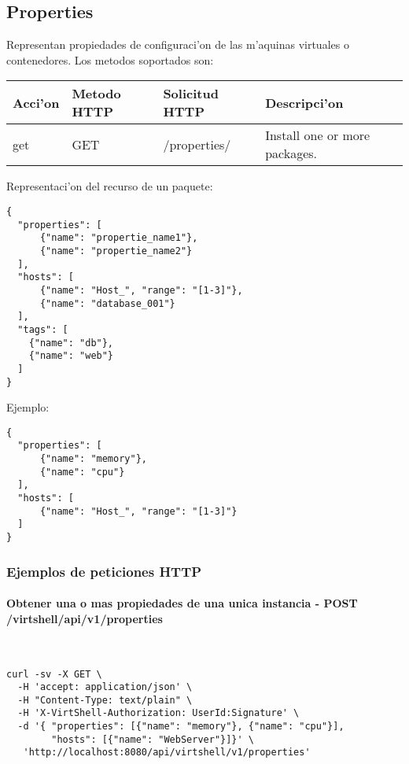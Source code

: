 \subsection{Properties}
Representan propiedades de configuraci'on de las m'aquinas virtuales o contenedores. Los metodos soportados son:

\begin{center}
 \begin{tabular}{| l | l | l | l |}
 \hline
  \rowcolor{blueapi}
  \textbf{Acci'on} & \textbf{Metodo HTTP} & \textbf{Solicitud HTTP} & \textbf{Descripci'on} \\ [0.5ex] 
  \hline\hline
  get & GET & /properties/ & Install one or more packages. \\ [1ex] 
  \hline
\end{tabular}
\end{center}

\vspace{1cm}
Representaci'on del recurso de un paquete:
\vspace{1cm}

\begin{lstlisting}[style=json]
{
  "properties": [
      {"name": "propertie_name1"},
      {"name": "propertie_name2"}
  ],
  "hosts": [ 
      {"name": "Host_", "range": "[1-3]"}, 
      {"name": "database_001"}
  ],
  "tags": [
    {"name": "db"},
    {"name": "web"}
  ]
}
\end{lstlisting}

Ejemplo:

\medskip
\begin{lstlisting}[style=json]
{
  "properties": [
      {"name": "memory"},
      {"name": "cpu"}
  ],
  "hosts": [ 
      {"name": "Host_", "range": "[1-3]"}
  ]
}
\end{lstlisting}

\subsubsection{Ejemplos de peticiones HTTP}

\paragraph{Obtener una o mas propiedades de una unica instancia - POST /virtshell/api/v1/properties} ~\\

\begin{lstlisting}[style=json]
curl -sv -X GET \
  -H 'accept: application/json' \
  -H "Content-Type: text/plain" \
  -H 'X-VirtShell-Authorization: UserId:Signature' \
  -d '{ "properties": [{"name": "memory"}, {"name": "cpu"}],
        "hosts": [{"name": "WebServer"}]}' \
   'http://localhost:8080/api/virtshell/v1/properties'
\end{lstlisting}

